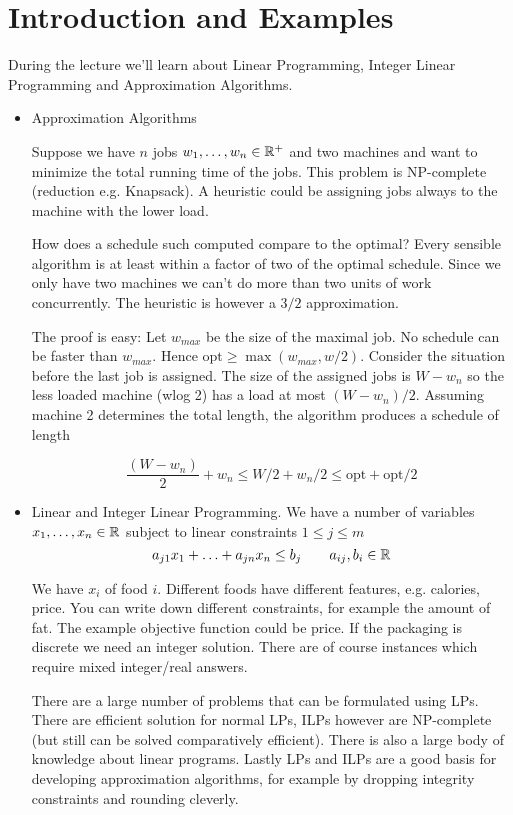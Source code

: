 \section{Introduction and Examples}
During the lecture we'll learn about Linear Programming, Integer Linear Programming and Approximation Algorithms.

\begin{itemize}
\item Approximation Algorithms
\begin{Ex} Suppose we have $n$ jobs ${w}_1,\ldots,{w}_n\in \mathbb{R}^+$ and two machines and want to minimize the total running time of the jobs. This problem is NP-complete (reduction e.g. Knapsack). A heuristic could be assigning jobs always to the machine with the lower load.

How does a schedule such computed compare to the optimal? Every sensible algorithm is at least within a factor of two of the optimal schedule. Since we only have two machines we can't do more than two units of work concurrently. The heuristic is however a $3/2$ approximation.

The proof is easy: Let $w_{max}$ be the size of the maximal job. No schedule can be faster than $w_{max}$. Hence $\mbox{opt} \geq \max (w_{max}, w/2)$. Consider the situation before the last job is assigned. The size of the assigned jobs is $W-w_n$ so the less loaded machine (wlog 2) has a load at most $(W-w_n)/2$. Assuming machine 2 determines the total length, the algorithm produces a schedule of length 

\[\frac{(W-w_n)}{2} + w_n \leq W/2+w_n/2 \leq \mbox{opt} + \mbox{opt}/2\]
\end{Ex}
\item Linear and Integer Linear Programming. We have a number of variables ${x}_1,\ldots,{x}_n\in \mathbb{R}$ subject to linear constraints $1\leq j\leq m$
\[a_{j1}x_1 + \ldots + a_{jn} x_n \leq b_j \qquad a_{ij},b_i \in \mathbb{R}\]

\begin{Ex} We have $x_i$ of food $i$. Different foods have different features, e.g. calories, price. You can write down different constraints, for example the amount of fat. The example objective function could be price. If the packaging is discrete we need an integer solution. There are of course instances which require mixed integer/real answers.
\end{Ex}

There are a large number of problems that can be formulated using LPs. There are efficient solution for normal LPs, ILPs however are NP-complete (but still can be solved comparatively efficient). There is also a large body of knowledge about linear programs. Lastly LPs and ILPs are a good basis for developing approximation algorithms, for example by dropping integrity constraints and rounding cleverly.


\end{itemize}
